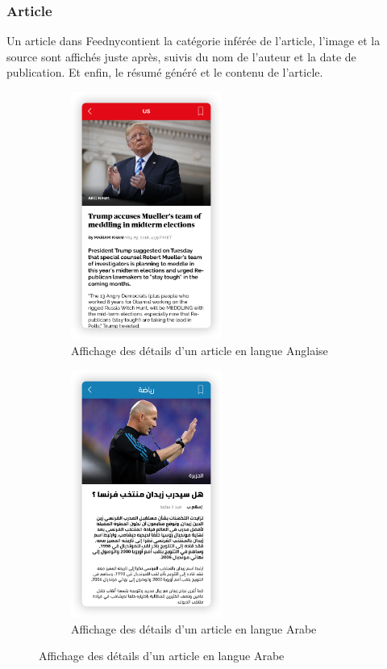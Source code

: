\subsubsection{Article}
Un article dans \textquotedbl Feedny\textquotedbl contient la catégorie inférée de l'article, l'image et la source sont affichés juste après, suivis du nom de l'auteur et la date de publication. Et enfin, le résumé généré et le contenu de l'article.   

\begin{figure}[H]
    \begin{minipage}{0.48\textwidth}
        \begin{figure}[H]
            \centering
            \includegraphics[width=140pt]{img/chapter4/feedny/en-article.png}
            \caption{Affichage des détails d'un article en langue Anglaise}
        \end{figure}
    \end{minipage}\hfill
    \begin {minipage}{0.48\textwidth}
    \begin{figure}[H]
        \centering
        \includegraphics[width=140pt]{img/chapter4/feedny/ar-article.png}
        \caption{Affichage des détails d'un article en langue Arabe}
    \end{figure}
\end{minipage}
\label{article-display}
\end{figure}

